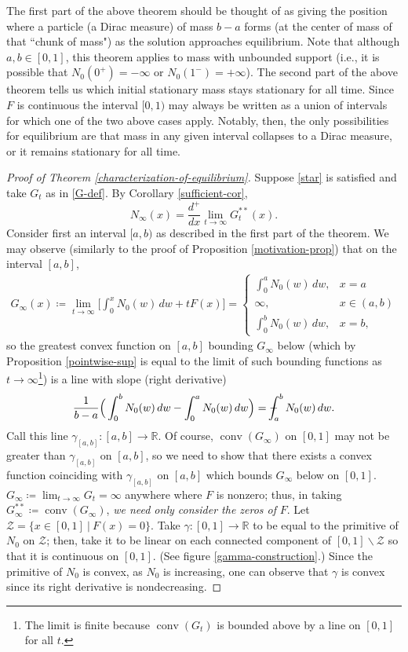 \documentclass[10pt,a4paper]{amsart}
\numberwithin{equation}{section}
\def\Xint#1{\mathchoice
{\XXint\displaystyle\textstyle{#1}}%
{\XXint\textstyle\scriptstyle{#1}}%
{\XXint\scriptstyle\scriptscriptstyle{#1}}%
{\XXint\scriptscriptstyle\scriptscriptstyle{#1}}%
   \!\int}
\def\XXint#1#2#3{{\setbox0=\hbox{$#1{#2#3}{\int}$}
\vcenter{\hbox{$#2#3$}}\kern-.5\wd0}}
\def\dashint{\Xint-}
\DeclareMathOperator{\conv}{conv}
\begin{document}
The first part of the above theorem should be thought of as giving the position where a particle (a Dirac measure) of mass $b-a$ forms (at the center of mass of that ``chunk of mass") as the solution approaches equilibrium. Note that although $a, b\in [0,1]$, this theorem applies to mass with unbounded support (i.e., it is possible that $N_0(0^+)=-\infty$ or $N_0(1^-)=+\infty$). The second part of the above theorem tells us which initial stationary mass stays stationary for all time. Since  $F$ is continuous the interval $[0,1)$ may always be written as a union of intervals for which one of the two above cases apply. Notably, then, the only possibilities for equilibrium are that mass in any given interval collapses to a Dirac measure, or it remains stationary for all time. 


\begin{proof}[Proof of Theorem \ref{characterization-of-equilibrium}]
Suppose \eqref{star} is satisfied and take $G_t$ as in \eqref{G-def}. By Corollary \ref{sufficient-cor}, 
$$N_\infty(x)=\frac{d^+}{dx}\lim_{t\to\infty}G_t^{**}(x).$$ 
Consider first an interval $[a,b)$ as described in the first part of the theorem. We may observe (similarly to the proof of Proposition \ref{motivation-prop}) that on the interval $[a,b]$, 
\begin{align*}
    G_\infty(x)\coloneq\lim_{t\to\infty}\Big[\int_0^x N_0(w) \, dw+tF(x)\Big]=\begin{cases}
        \displaystyle\int_0^a N_0(w) \, dw, &x=a
        \\
        \infty, &x\in(a,b)
        \\
        \displaystyle\int_0^b N_0(w) \, dw, &x=b, 
    \end{cases}
\end{align*} 
so the greatest convex function on $[a,b]$ bounding $G_\infty$ below (which by Proposition \ref{pointwise-sup} is equal to the limit of such bounding functions as $t\to\infty$\footnote{The limit is finite because $\conv (G_t)$ is bounded above by a line on $[0,1]$ for all $t$.}) is a line with slope (right derivative)
\begin{align*}
    \frac{1}{b-a}\Big(\int_0^b N_0(w) \, dw-\int_0^a N_0(w) \, dw\Big)=\dashint_a^b N_0(w) \, dw. 
\end{align*}
Call this line $\gamma_{[a,b]}:[a,b]\to\mathbb{R}$. Of course, $\conv(G_\infty)$ on $[0,1]$ may not be greater than $\gamma_{[a,b]}$ on $[a, b]$, so we need to show that there exists a convex function coinciding with $\gamma_{[a,b]}$ on $[a, b]$ which bounds $G_\infty$ below on $[0,1]$. $G_\infty\coloneq\lim_{t\to\infty}G_t=\infty$ anywhere where $F$ is nonzero; thus, in taking $G_\infty^{**}\coloneq\conv(G_\infty)$, \textit{we need only consider the zeros of} $F$. Let $\mathcal{Z}=\{x\in[0,1] \ | \ F(x)=0\}$. Take $\gamma:[0,1]\to\mathbb{R}$ to be equal to the primitive of $N_0$ on $\mathcal{Z}$; then, take it to be linear on each connected component of $[0,1]\backslash\mathcal{Z}$ so that it is continuous on $[0,1]$. (See figure \ref{gamma-construction}.) Since the primitive of $N_0$ is convex, as $N_0$ is increasing, one can observe that $\gamma$ is convex since its right derivative is nondecreasing. 


\end{proof}
\end{document}

